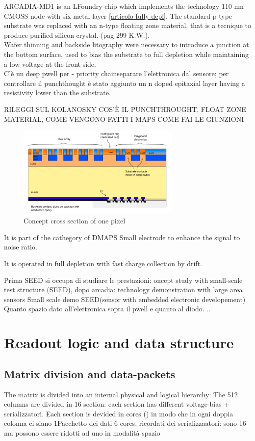 ARCADIA-MD1 is an LFoundry chip which implements the technology 110 nm CMOSS node
with six metal layer \ref{articolo fully depl}.
The standard p-type substrate was replaced with an n-type floating zone material,
that is a tecnique to produce purified silicon crystal. (pag 299 K.W.).\\

Wafer thinning and backside litography were necessary to introduce a junction
at the bottom surface, used to bias the substrate to full depletion while
maintaining a low voltage at the front side.  \\
C'è un deep pwell per - priority chainseparare l'elettronica dal sensore; per controllare il punchthought
è stato aggiunto un n doped epitaxial layer having a resistivity lower than the substrate.

RILEGGI SUL KOLANOSKY COS'È IL PUNCHTHROUGHT, FLOAT ZONE MATERIAL, COME VENGONO FATTI I MAPS
COME FAI LE GIUNZIONI

\begin{figure}
\centering\includegraphics[width=8cm]{figures/pixel_scheme.png}
\caption{Concept cross section of one pixel}
\label{fig:pixel_scheme}
\end{figure}

It is part of the cathegory of DMAPS
Small electrode to enhance the signal to noise ratio.

It is operated in full depletion with fast charge collection by drift.

Prima SEED si occupa di studiare le prestazioni: oncept study with small-scale test structure (SEED),
dopo arcadia: technology demonstration with large area sensors
Small scale demo SEED(sensor with embedded electronic developement)
Quanto spazio dato all'elettronica sopra il pwell e quanto al diodo. ..

\section{Readout logic and data structure}
\subsection{Matrix division and data-packets}
The matrix is divided into an internal physical and logical hierarchy:
The 512 columns are divided in 16 section: each section has different voltage-bias + serializzatori.
Each section is devided in cores () in modo che in ogni doppia colonna ci siano 1Pacchetto dei dati
6 cores. ricordati dei serializzaatori: sono 16 ma possono essere ridotti ad uno in modalità spazio

